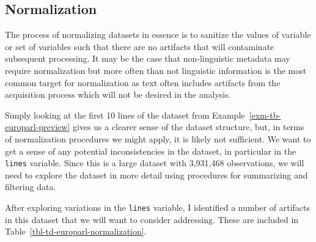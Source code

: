 \documentclass[
  letterpaper,
]{latex/krantz}
\theoremstyle{definition}
\theoremstyle{remark}
\begin{document}
\subsection{Normalization}\label{sec-td-normalization}

The process of normalizing datasets in essence is to sanitize the values
of variable or set of variables such that there are no artifacts that
will contaminate subsequent processing. It may be the case that
non-linguistic metadata may require normalization but more often than
not linguistic information is the most common target for normalization
as text often includes artifacts from the acquisition process which will
not be desired in the analysis.

Simply looking at the first 10 lines of the dataset from
Example~\ref{exm-tb-europarl-preview} gives us a clearer sense of the
dataset structure, but, in terms of normalization procedures we might
apply, it is likely not sufficient. We want to get a sense of any
potential inconsistencies in the dataset, in particular in the
\texttt{lines} variable. Since this is a large dataset with 3,931,468
observations, we will need to explore the dataset in more detail using
procedures for summarizing and filtering data.

After exploring variations in the \texttt{lines} variable, I identified
a number of artifacts in this dataset that we will want to consider
addressing. These are included in
Table~\ref{tbl-td-europarl-normalization}.
\end{document}
